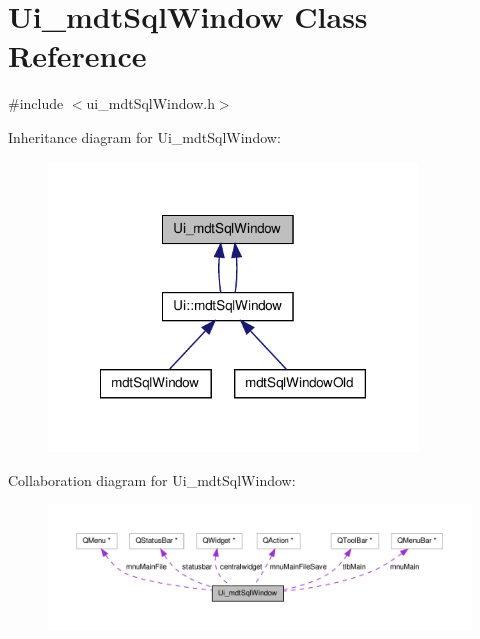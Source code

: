 \hypertarget{class_ui__mdt_sql_window}{\section{Ui\-\_\-mdt\-Sql\-Window Class Reference}
\label{class_ui__mdt_sql_window}
}


{\ttfamily \#include $<$ui\-\_\-mdt\-Sql\-Window.\-h$>$}



Inheritance diagram for Ui\-\_\-mdt\-Sql\-Window\-:\nopagebreak
\begin{figure}[H]
\begin{center}
\leavevmode
\includegraphics[width=278pt]{class_ui__mdt_sql_window__inherit__graph}
\end{center}
\end{figure}


Collaboration diagram for Ui\-\_\-mdt\-Sql\-Window\-:\nopagebreak
\begin{figure}[H]
\begin{center}
\leavevmode
\includegraphics[width=350pt]{class_ui__mdt_sql_window__coll__graph}
\end{center}
\end{figure}
